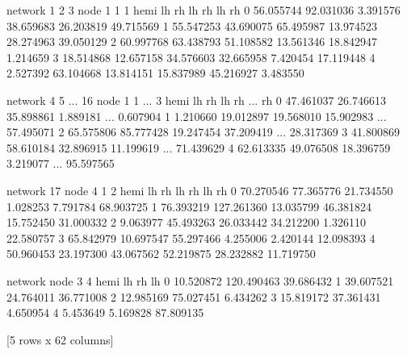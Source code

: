 \documentclass[letterpaper,10pt,english]{jupyterBook}
\begin{document}
\begin{sphinxVerbatim}[commandchars=\\\{\}]
network          1                     2                     3             \PYGZbs{}
node             1                     1                     1              
hemi            lh         rh         lh         rh         lh         rh   
0        56.055744  92.031036   3.391576  38.659683  26.203819 \PYGZhy{}49.715569   
1        55.547253  43.690075 \PYGZhy{}65.495987 \PYGZhy{}13.974523 \PYGZhy{}28.274963 \PYGZhy{}39.050129   
2        60.997768  63.438793 \PYGZhy{}51.108582 \PYGZhy{}13.561346 \PYGZhy{}18.842947  \PYGZhy{}1.214659   
3        18.514868  12.657158 \PYGZhy{}34.576603 \PYGZhy{}32.665958  \PYGZhy{}7.420454  17.119448   
4        \PYGZhy{}2.527392 \PYGZhy{}63.104668 \PYGZhy{}13.814151 \PYGZhy{}15.837989 \PYGZhy{}45.216927   3.483550   

network          4                     5             ...         16  \PYGZbs{}
node             1                     1             ...          3   
hemi            lh         rh         lh         rh  ...         rh   
0        47.461037  26.746613 \PYGZhy{}35.898861  \PYGZhy{}1.889181  ...   0.607904   
1        \PYGZhy{}1.210660 \PYGZhy{}19.012897  19.568010  15.902983  ...  57.495071   
2       \PYGZhy{}65.575806 \PYGZhy{}85.777428  19.247454  37.209419  ...  28.317369   
3       \PYGZhy{}41.800869 \PYGZhy{}58.610184  32.896915  11.199619  ...  71.439629   
4       \PYGZhy{}62.613335 \PYGZhy{}49.076508  18.396759   3.219077  ...  95.597565   

network                                17                                   \PYGZbs{}
node             4                      1                     2              
hemi            lh          rh         lh         rh         lh         rh   
0       \PYGZhy{}70.270546   77.365776 \PYGZhy{}21.734550   1.028253   7.791784  68.903725   
1       \PYGZhy{}76.393219  127.261360 \PYGZhy{}13.035799  46.381824 \PYGZhy{}15.752450  31.000332   
2         9.063977   45.493263  26.033442  34.212200   1.326110 \PYGZhy{}22.580757   
3        65.842979  \PYGZhy{}10.697547  55.297466   4.255006  \PYGZhy{}2.420144  12.098393   
4        50.960453  \PYGZhy{}23.197300  43.067562  52.219875  28.232882 \PYGZhy{}11.719750   

network                                    
node             3                      4  
hemi            lh          rh         lh  
0       \PYGZhy{}10.520872  120.490463 \PYGZhy{}39.686432  
1       \PYGZhy{}39.607521   24.764011 \PYGZhy{}36.771008  
2        12.985169  \PYGZhy{}75.027451   6.434262  
3       \PYGZhy{}15.819172  \PYGZhy{}37.361431  \PYGZhy{}4.650954  
4         5.453649    5.169828  87.809135  

[5 rows x 62 columns]
\end{sphinxVerbatim}
\end{document}
